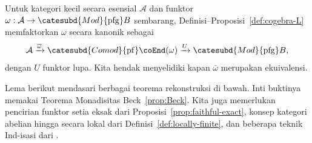 Untuk kategori kecil secara esensial $\mathcal{A}$ dan funktor
$\omega:\mathcal{A}\to\catesubd{Mod}{\mathrm{pfg}}B$ sembarang,
Definisi--Proposisi~\ref{def:cogebra-L} memfaktorkan $\omega$ secara
kanonik sebagai
\begin{equation}\label{eqn:L-canonical-decomp}
	\mathcal{A} \xrightarrow{\overline{\omega}} \catesubd{Comod}{\mathrm{pf}}\coEnd(\omega) \xrightarrow{U} \catesubd{Mod}{\mathrm{pfg}}B,
\end{equation}
dengan $U$ funktor lupa. Kita hendak menyelidiki kapan
$\overline\omega$ merupakan ekuivalensi.

Lema berikut mendasari berbagai teorema rekonstruksi di bawah. Inti
buktinya memakai Teorema Monadisitas Beck~\ref{prop:Beck}. Kita juga
memerlukan pencirian funktor setia eksak dari
Proposisi~\ref{prop:faithful-exact}, konsep kategori abelian hingga secara lokal dari
Definisi~\ref{def:locally-finite}, dan beberapa teknik Ind-isasi dari
.

